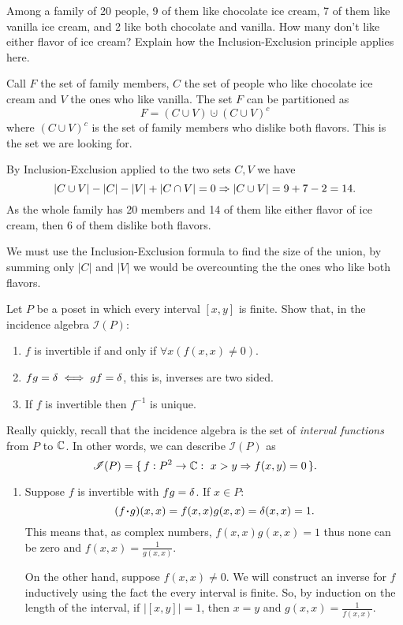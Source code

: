 \documentclass[12pt]{memoir}
\begin{document}
\begin{Ej}[Exercise 1]
    Among a family of 20 people, 9 of them like chocolate ice cream, 7 of them like vanilla ice cream, and 2 like both chocolate and vanilla. How many don't like either flavor of ice cream? Explain how the Inclusion-Exclusion principle applies here.
 \end{Ej}

\begin{ptcbr}
   Call $F$ the set of family members, $C$ the set of people who like chocolate ice cream and $V$ the ones who like vanilla. The set $F$ can be partitioned as 
   $$F=(C\cup V)\cupdot (C\cup V)^c$$
   where $(C\cup V)^c$ is the set of family members who dislike both flavors. This is the set we are looking for.\par 
   By Inclusion-Exclusion applied to the two sets $C,V$ we have 
   $$|C\cup V|-|C|-|V|+|C\cap V|=0\Rightarrow |C\cup V|=9+7-2=14.$$
   As the whole family has 20 members and 14 of them like either flavor of ice cream, then 6 of them dislike both flavors.\par 
   We must use the Inclusion-Exclusion formula to find the size of the union, by summing only $|C|$ and $|V|$ we would be overcounting the the ones who like both flavors.
\end{ptcbr}

\begin{Ej}
    Let $P$ be a poset in which every interval $[x, y]$ is finite. Show that, in the incidence algebra $\mathscr{I}(P)$:
    \vspace*{-0.4em}
    \begin{enumerate}
        \itemsep=-0.4em
        \item $f$ is invertible if and only if $\forall x(f(x,x)\neq 0)$.
        \item $fg=\delta\iff gf=\delta$, this is, inverses are two sided.
        \item If $f$ is invertible then $f^{-1}$ is unique.
    \end{enumerate}
\end{Ej}

Really quickly, recall that the incidence algebra is the set of \emph{interval functions} from $P$ to $\mathbb{C}$. In other words, we can describe $\mathscr{I}(P)$ as 
$$\mathscr{I}(P)=\set{f:P^2\to\bC:\ x>y\To f(x,y)=0}.$$
\begin{ptcbr}
    \begin{enumerate}
        \itemsep=-0.4em
        \item Suppose $f$ is invertible with $fg=\delta$. If $x\in P$:
        $$(f\.g)(x,x)=f(x,x)g(x,x)=\dl(x,x)=1.$$
        This means that, as complex numbers, $f(x,x)g(x,x)=1$ thus none can be zero and $f(x,x)=\frac{1}{g(x,x)}$.\par 
        On the other hand, suppose $f(x,x)\neq 0$. We will construct an inverse for $f$ inductively using the fact the every interval is finite. So, by induction on the length of the interval, if $|[x,y]|=1$, then $x=y$ and $g(x,x)=\frac{1}{f(x,x)}$. 
    \end{enumerate}
\end{ptcbr}
\end{document}

